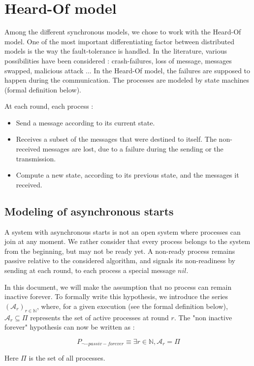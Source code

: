 \documentclass{article}
\begin{document}
\section{Heard-Of model}

Among the different synchronous models, we chose to work with the Heard-Of model.
One of the most important differentiating factor between distributed models is the way the fault-tolerance is handled.
In the literature, various possibilities have been considered : crash-failures, loss of message, messages swapped, malicious attack ...
In the Heard-Of model, the failures are supposed to happen during the communication.
The processes are modeled by state machines (formal definition below).

At each round, each process :
\begin{itemize}
	\item Send a message according to its current state.
	\item Receives a subset of the messages that were destined to itself. The non-received messages are lost, due to a failure during the sending or the transmission.
	\item Compute a new state, according to its previous state, and the messages it received.
\end{itemize}

\subsection{Modeling of asynchronous starts}

A system with asynchronous starts is not an open system where processes can join at any moment.
We rather consider that every process belongs to the system from the beginning, but may not be ready yet.
A non-ready process remains passive relative to the considered algorithm, and signals its non-readiness by sending at each round, to each process a special message $nil$.

In this document, we will make the assumption that no process can remain inactive forever.
To formally write this hypothesis, we introduce the series $(\mathcal{A}_r)_{r \in \mathds{N}}$, where, for a given execution (see the formal definition below), $\mathcal{A}_r \subseteq \Pi$ 
represents the set of active processes at round $r$.
The "non inactive forever" hypothesis can now be written as :

$$P_{\neg-passiv-forever} \equiv \exists r \in \mathds{N}, \mathcal{A}_r = \Pi$$

Here $\Pi$ is the set of all processes.
\end{document}
